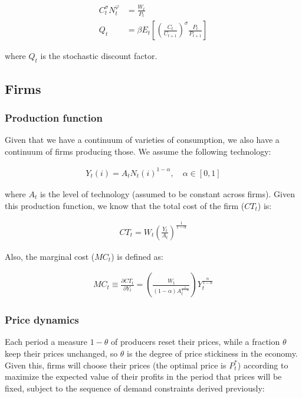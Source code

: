 \documentclass[11pt]{article}
\begin{document}
\begin{align*}
C_t^{\sigma}N_t^{\varphi}&=\frac{W_t}{P_t}\\
Q_t&=\beta E_t\left[\left(\frac{C_t}{C_{t+1}}\right)^{\sigma}\frac{P_t}{P_{t+1}}\right]
\end{align*}

where $Q_t$ is the stochastic discount factor.

\subsection*{Firms}

\subsubsection*{Production function}

Given that we have a continuum of varieties of consumption, we also have a continuum of firms producing those. We assume the following technology:

\begin{align*}
Y_t(i)=A_tN_t(i)^{1-\alpha}, \quad \alpha\in[0,1]
\end{align*}

where $A_t$ is the level of technology (assumed to be constant across firms). Given this production function, we know that the total cost of the firm ($CT_t$) is:

\begin{align*}
CT_t=W_t\left(\frac{Y_t}{A_t}\right)^{\frac{1}{1-\alpha}}
\end{align*}

Also, the marginal cost ($MC_t$) is defined as:

\begin{align*}
MC_t\equiv\frac{\partial CT_t}{\partial Y_t} = \left(\frac{W_t}{(1-\alpha)A_t^{\frac{1}{1-\alpha}}}\right)Y_t^{\frac{\alpha}{1-\alpha}}
\end{align*}

\subsubsection*{Price dynamics}

Each period a measure $1-\theta$ of producers reset their prices, while a fraction $\theta$ keep their prices unchanged, so $\theta$ is the degree of price stickiness in the economy. Given this, firms will choose their prices (the optimal price is $P_t^*$) according to maximize the expected value of their profits in the period that prices will be fixed, subject to the sequence of demand constraints derived previously:
\end{document}

